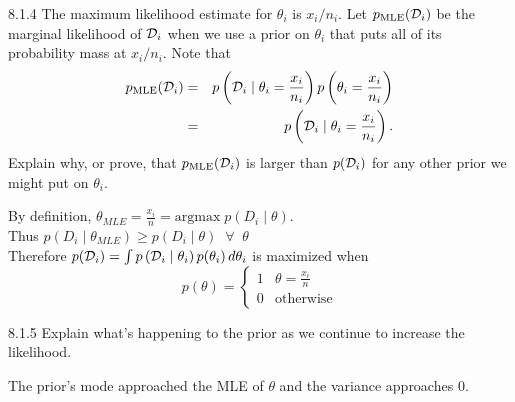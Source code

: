 \documentclass[12pt,letterpaper]{article}
\begin{document}
\begin{problem}{8.1.4}
    The maximum likelihood estimate for $\theta_{i}$ is $x_{i}/n_{i}$.
    Let $p_{\text{MLE}}(\mathcal{D}_{i})$ be the marginal likelihood of $\mathcal{D}_{i}$
    when we use a prior on $\theta_{i}$ that puts all of its probability
    mass at $x_{i}/n_{i}$. Note that 
    \begin{eqnarray*}
    p_{\text{MLE}}(\mathcal{D}_{i}) & = & p\left(\mathcal{D}_{i}\mid\theta_{i}=\frac{x_{i}}{n_{i}}\right)p\left(\theta_{i}=\frac{x_{i}}{n_{i}}\right)\\
     & = & p\left(\mathcal{D}_{i}\mid\theta_{i}=\frac{x_{i}}{n_{i}}\right).
    \end{eqnarray*}
    Explain why, or prove, that $p_{\text{MLE}}(\mathcal{D}_{i})$ is larger than
    $p(\mathcal{D}_{i})$ for any other prior we might put on $\theta_{i}$.
\end{problem}
\begin{solution}{}
    By definition, $\theta_{MLE} = \frac{x_i}{n} = \text{argmax}\; p(D_i\mid\theta)$.\\
    Thus $p(D_i\mid\theta_{MLE}) \geq p(D_i\mid\theta) \;\; \forall \;\; \theta$\\
    Therefore $p(\mathcal{D}_{i})=\int p\left(\mathcal{D}_{i}\mid\theta_{i}\right)p(\theta_{i})\,d\theta_{i}$ is maximized when 
     \[ p(\theta) =  \begin{cases} 
      1 & \theta = \frac{x_i}{n} \\
      0 & \text{otherwise}
   \end{cases}
    \]
\end{solution}
\newpage

\begin{problem}{8.1.5}
    Explain what's happening to the prior as we continue to increase the likelihood.
\end{problem}
\begin{solution}{}
    The prior's mode approached the MLE of $\theta$ and the variance approaches 0.
\end{solution}
\newpage
\end{document}
